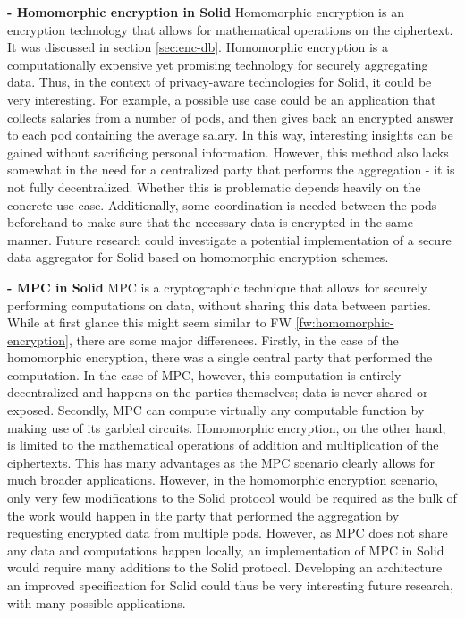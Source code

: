 \begin{futurework}\label{fw:homomorphic-encryption}
\textbf{- Homomorphic encryption in Solid} Homomorphic encryption is an encryption technology that allows for mathematical operations on the ciphertext. It was discussed in section \ref{sec:enc-db}. Homomorphic encryption is a computationally expensive yet promising technology for securely aggregating data. Thus, in the context of privacy-aware technologies for Solid, it could be very interesting.  For example, a possible use case could be an application that collects salaries from a number of pods, and then gives back an encrypted answer to each pod containing the average salary. In this way, interesting insights can be gained without sacrificing personal information. However, this method also lacks somewhat in the need for a centralized party that performs the aggregation - it is not fully decentralized. Whether this is problematic depends heavily on the concrete use case. Additionally, some coordination is needed between the pods beforehand to make sure that the necessary data is encrypted in the same manner. Future research could investigate a potential implementation of a secure data aggregator for Solid based on homomorphic encryption schemes.
\end{futurework}

\begin{futurework}\label{fw:mpc}
\textbf{- \gls{MPC} in Solid} \acrlong{MPC} is a cryptographic technique that allows for securely performing computations on data, without sharing this data between parties. While at first glance this might seem similar to FW \ref{fw:homomorphic-encryption}, there are some major differences. Firstly, in the case of the homomorphic encryption, there was a single central party that performed the computation. In the case of \gls{MPC}, however, this computation is entirely decentralized and happens on the parties themselves; data is never shared or exposed. Secondly, \gls{MPC} can compute virtually any computable function by making use of its garbled circuits. Homomorphic encryption, on the other hand, is limited to the mathematical operations of addition and multiplication of the ciphertexts. This has many advantages as the \gls{MPC} scenario clearly allows for much broader applications. However, in the homomorphic encryption scenario, only very few modifications to the Solid protocol would be required as the bulk of the work would happen in the party that performed the aggregation by requesting encrypted data from multiple pods. However, as \gls{MPC} does not share any data and computations happen locally, an implementation of \gls{MPC} in Solid would require many additions to the Solid protocol. Developing an architecture an improved specification for Solid could thus be very interesting future research, with many possible applications.
\end{futurework}

